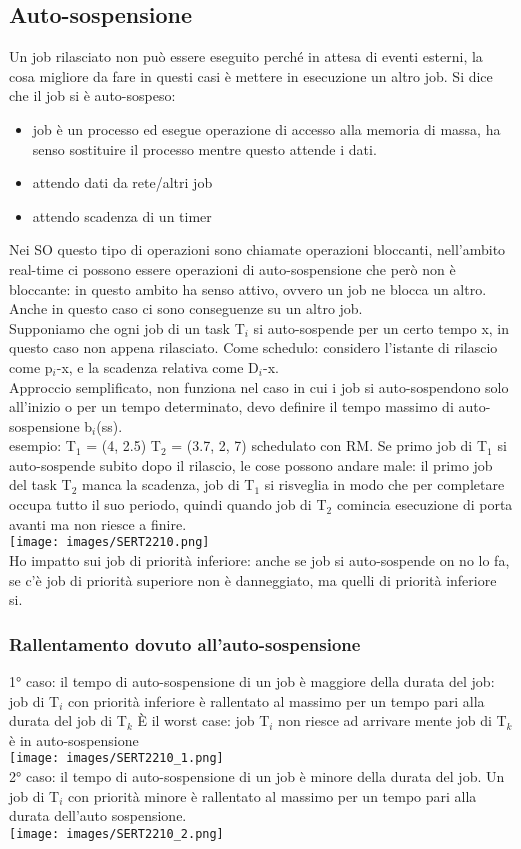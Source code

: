 \documentclass[18px]{article}
\begin{document}
\subsection{Auto-sospensione}
Un job rilasciato non può essere eseguito perché in attesa di eventi esterni, la cosa migliore da fare in questi casi è mettere in esecuzione un altro job. Si dice che il job si è auto-sospeso:
\begin{itemize}
\item job è un processo ed esegue operazione di accesso alla memoria di massa, ha senso sostituire il processo mentre questo attende i dati.
\item attendo dati da rete/altri job
\item attendo scadenza di un timer
\end{itemize}
Nei SO questo tipo di operazioni sono chiamate operazioni bloccanti, nell'ambito real-time ci possono essere operazioni di auto-sospensione che però non è bloccante: in questo ambito ha senso attivo, ovvero un job ne blocca un altro. Anche in questo caso ci sono conseguenze su un altro job.\\ Supponiamo che ogni job di un task T$_{i}$ si auto-sospende per un certo tempo x, in questo caso non appena rilasciato. Come schedulo: considero l'istante di rilascio come p$_{i}$-x, e la scadenza relativa come D$_{i}$-x.\\ Approccio semplificato, non funziona nel caso in cui i job si auto-sospendono solo all'inizio o per un tempo determinato, devo definire il tempo massimo di auto-sospensione b$_{i}$(ss).\\ esempio: T$_{1}$ = (4, 2.5) T$_{2}$ = (3.7, 2, 7) schedulato con RM. Se primo job di T$_{1}$ si auto-sospende subito dopo il rilascio, le cose possono andare male: il primo job del task T$_{2}$ manca la scadenza, job di T$_{1}$ si risveglia in modo che per completare occupa tutto il suo periodo, quindi quando job di T$_{2}$ comincia esecuzione di porta avanti ma non riesce a finire.\\
\texttt{[image: images/SERT2210.png]}\\
Ho impatto sui job di priorità inferiore: anche se job si auto-sospende on no lo fa, se c'è job di priorità superiore non è danneggiato, ma quelli di priorità inferiore si.
\subsubsection{Rallentamento dovuto all'auto-sospensione}
1° caso: il tempo di auto-sospensione di un job è maggiore della durata del job: job di T$_{i}$ con priorità inferiore è rallentato al massimo per un tempo pari alla durata del job di T$_{k}$ È il worst case: job T$_{i}$ non riesce ad arrivare mente job di T$_{k}$ è in auto-sospensione\\
\texttt{[image: images/SERT2210\_1.png]}\\
2° caso: il tempo di auto-sospensione di un job è minore della durata del job. Un job di T$_{i}$ con priorità minore è rallentato al massimo per un tempo pari alla durata dell'auto sospensione.\\
\texttt{[image: images/SERT2210\_2.png]}
\end{document}
